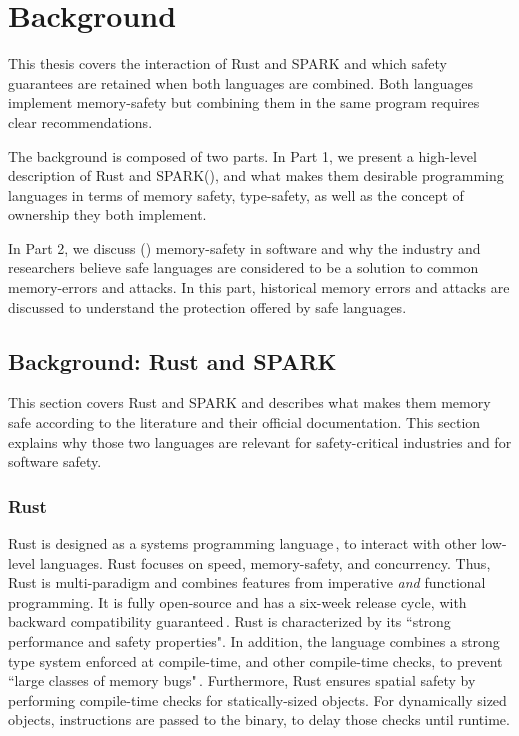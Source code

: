 \documentclass[nomenclature, english, bibtex]{kththesis}
\begin{document}
\cleardoublepage\chapter{Background}
\label{ch:background}

This thesis covers the interaction of Rust and SPARK and which safety guarantees are retained when both languages are combined. Both languages implement \gls{memory-safety} but combining them in the same program requires clear recommendations. 

The background is composed of two parts. 
In Part 1, we present a 
high-level description of Rust and SPARK(), and what makes them desirable programming languages in terms of memory safety, \gls{type-safety}, as well as the concept of \gls{ownership} they both implement.

In Part 2, we discuss () \gls{memory-safety} in software and why the industry and researchers believe safe languages are considered to be a solution to common \gls{memory-error}s and attacks. In this part, historical memory errors and attacks are discussed to understand the protection offered by safe languages. 

\section{Background: Rust and SPARK}
\label{sec:rust_and_spark}

This section covers Rust and SPARK and describes what makes them memory safe according to the literature and their official documentation. This section explains why those two languages are relevant for \gls{safety-critical} industries and for software safety.


\subsection{Rust}

Rust is designed as a systems programming language\,\cite{mergendahl_cross-language_2022}, to interact with other low-level languages. Rust focuses on speed, \gls{memory-safety}, and concurrency. Thus, Rust is multi-paradigm and combines features from imperative \textit{and} functional programming. It is fully open-source and has a six-week release cycle, with backward compatibility guaranteed\,\cite{poveda_ruiz_bounded_2019,noauthor_rust_nodate}. Rust is characterized by its ``strong performance and safety properties". In addition, the language combines a strong type system enforced at compile-time, and other compile-time checks, to prevent ``large classes of memory bugs"\,\cite{mergendahl_cross-language_2022}. Furthermore, Rust ensures spatial safety by performing compile-time checks for statically-sized objects. For dynamically sized objects, instructions are passed to the binary, to delay those checks until runtime.
\end{document}
